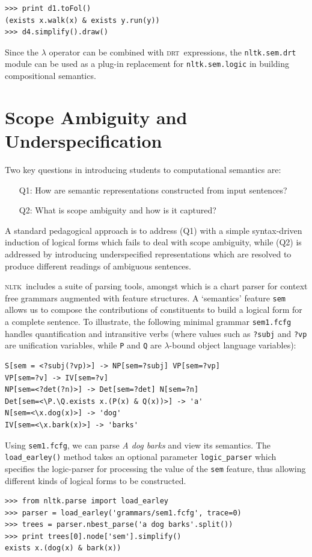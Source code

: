 \documentclass[11pt, a4paper]{article}
\newcommand{\DRT}{\textsc{drt}}
\newcommand{\NLTK}{\textsc{nltk}}
\begin{document}
\begin{Verbatim}[frame=none]
>>> print d1.toFol()
(exists x.walk(x) & exists y.run(y))
>>> d4.simplify().draw()
\end{Verbatim}

Since the $\lambda$ operator can be combined with \DRT\ expressions,
the \texttt{nltk.sem.drt} module can be used as a plug-in replacement for 
\texttt{nltk.sem.logic} in building compositional semantics.


\section{Scope Ambiguity and Underspecification}

Two key questions in introducing students to computational semantics are:
\begin{enumerate}
\item[Q1:] How are semantic representations constructed from input
  sentences?
\vspace{-2ex}
\item[Q2:] What is scope ambiguity and how is it captured?
\end{enumerate}
A standard pedagogical approach is to address (Q1) with a simple
syntax-driven induction of logical forms which fails to deal with
scope ambiguity, while (Q2) is addressed by introducing underspecified
representations which are resolved to produce different readings of
ambiguous sentences.

\NLTK\ includes a suite of parsing tools, amongst which is a chart
parser for context free grammars augmented with feature structures. A
`semantics' feature \texttt{sem} allows us to compose the
contributions of constituents to build a logical form for a complete
sentence.  To illustrate, the following minimal grammar
\texttt{sem1.fcfg} handles quantification and intransitive verbs
(where values such as \texttt{?subj} and \texttt{?vp} are unification
variables, while \texttt{P} and \texttt{Q} are $\lambda$-bound object
language variables):
\begin{Verbatim}
S[sem = <?subj(?vp)>] -> NP[sem=?subj] VP[sem=?vp]
VP[sem=?v] -> IV[sem=?v]
NP[sem=<?det(?n)>] -> Det[sem=?det] N[sem=?n]
Det[sem=<\P.\Q.exists x.(P(x) & Q(x))>] -> 'a'
N[sem=<\x.dog(x)>] -> 'dog'
IV[sem=<\x.bark(x)>] -> 'barks'
\end{Verbatim}
Using \texttt{sem1.fcfg}, we can parse \textit{A dog barks} and view
its semantics. 
The \texttt{load\_earley()} method
takes an optional parameter \texttt{logic\_parser} which specifies the
logic-parser for processing the value of the \texttt{sem} feature, thus
allowing different kinds of logical forms to be constructed.
\begin{Verbatim}
>>> from nltk.parse import load_earley
>>> parser = load_earley('grammars/sem1.fcfg', trace=0)
>>> trees = parser.nbest_parse('a dog barks'.split())
>>> print trees[0].node['sem'].simplify()
exists x.(dog(x) & bark(x))
\end{Verbatim}
\end{document}
